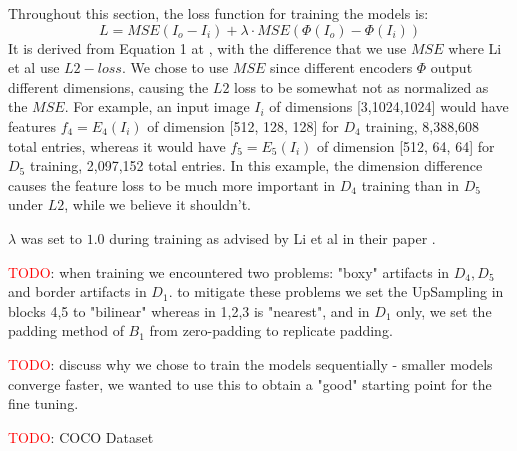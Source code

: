 Throughout this section, the loss function for training the models is:
\begin{equation}\label{eq:loss}
L = MSE(I_o-I_i) + \lambda \cdot MSE(\Phi(I_o)-\Phi(I_i))
\end{equation}
It is derived from Equation 1 at \cite{bib11}, with the difference that we use $MSE$ where Li et al use $L2 -loss$. We chose to use $MSE$ since different encoders $\Phi$ output different dimensions, causing the $L2$ loss to be  somewhat not as normalized as the $MSE$. For example, an input image $I_i$ of dimensions [3,1024,1024] would have features $f_4=E_4(I_i)$ of dimension [512, 128, 128] for $D_4$ training, 8,388,608 total entries, whereas it would have $f_5=E_5(I_i)$ of dimension [512, 64, 64] for $D_5$ training, 2,097,152 total entries. In this example, the dimension difference causes the feature loss to be much more important in $D_4$ training than in $D_5$ under $L2$, while we believe it shouldn't.

$\lambda$ was set to $1.0$ during training as advised by Li et al in their paper \cite{bib11}.

\textcolor{red}{TODO}: when training we encountered two problems: "boxy" artifacts in $D_4, D_5$ and border artifacts in $D_1$. to mitigate these problems we set the UpSampling in blocks 4,5 to "bilinear" whereas in 1,2,3 is "nearest", and in $D_1$ only, we set the padding method of $B_1$ from zero-padding to replicate padding.

\textcolor{red}{TODO}: discuss why we chose to train the models sequentially - smaller models converge faster, we wanted to use this to obtain a "good" starting point for the fine tuning.

\textcolor{red}{TODO}: COCO Dataset
